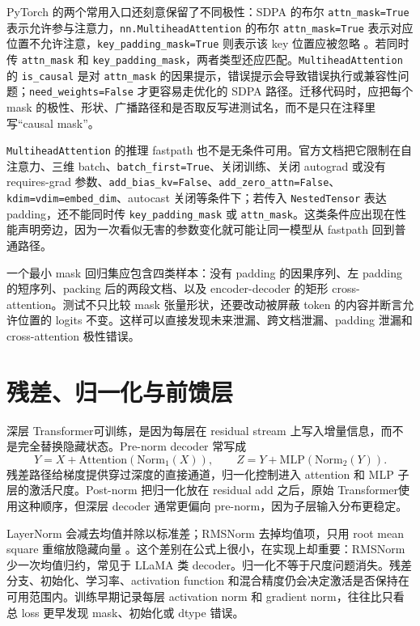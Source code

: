 \documentclass[UTF8,zihao=-4,openany]{ctexbook}
\newcommand{\Transformer}{Transformer}
\begin{document}
PyTorch 的两个常用入口还刻意保留了不同极性：SDPA 的布尔 \texttt{attn\_mask=True} 表示允许参与注意力，\texttt{nn.MultiheadAttention} 的布尔 \texttt{attn\_mask=True} 表示对应位置不允许注意，\texttt{key\_padding\_mask=True} 则表示该 key 位置应被忽略 \cite{pytorch2026multiheadattention}。若同时传 \texttt{attn\_mask} 和 \texttt{key\_padding\_mask}，两者类型还应匹配。\texttt{MultiheadAttention} 的 \texttt{is\_causal} 是对 \texttt{attn\_mask} 的因果提示，错误提示会导致错误执行或兼容性问题；\texttt{need\_weights=False} 才更容易走优化的 SDPA 路径。迁移代码时，应把每个 mask 的极性、形状、广播路径和是否取反写进测试名，而不是只在注释里写“causal mask”。

\texttt{MultiheadAttention} 的推理 fastpath 也不是无条件可用。官方文档把它限制在自注意力、三维 batch、\texttt{batch\_first=True}、关闭训练、关闭 autograd 或没有 requires-grad 参数、\texttt{add\_bias\_kv=False}、\texttt{add\_zero\_attn=False}、\texttt{kdim=vdim=embed\_dim}、autocast 关闭等条件下；若传入 \texttt{NestedTensor} 表达 padding，还不能同时传 \texttt{key\_padding\_mask} 或 \texttt{attn\_mask}。这类条件应出现在性能声明旁边，因为一次看似无害的参数变化就可能让同一模型从 fastpath 回到普通路径。

一个最小 mask 回归集应包含四类样本：没有 padding 的因果序列、左 padding 的短序列、packing 后的两段文档、以及 encoder-decoder 的矩形 cross-attention。测试不只比较 mask 张量形状，还要改动被屏蔽 token 的内容并断言允许位置的 logits 不变。这样可以直接发现未来泄漏、跨文档泄漏、padding 泄漏和 cross-attention 极性错误。

\section{残差、归一化与前馈层}
深层 \Transformer 可训练，是因为每层在 residual stream 上写入增量信息，而不是完全替换隐藏状态。Pre-norm decoder 常写成
\[
Y=X+\mathrm{Attention}(\mathrm{Norm}_1(X)),\qquad
Z=Y+\mathrm{MLP}(\mathrm{Norm}_2(Y)).
\]
残差路径给梯度提供穿过深度的直接通道，归一化控制进入 attention 和 MLP 子层的激活尺度。Post-norm 把归一化放在 residual add 之后，原始 \Transformer 使用这种顺序，但深层 decoder 通常更偏向 pre-norm，因为子层输入分布更稳定。

LayerNorm 会减去均值并除以标准差；RMSNorm 去掉均值项，只用 root mean square 重缩放隐藏向量 \cite{zhang2019root}。这个差别在公式上很小，在实现上却重要：RMSNorm 少一次均值归约，常见于 LLaMA 类 decoder。归一化不等于尺度问题消失。残差分支、初始化、学习率、activation function 和混合精度仍会决定激活是否保持在可用范围内。训练早期记录每层 activation norm 和 gradient norm，往往比只看总 loss 更早发现 mask、初始化或 dtype 错误。
\end{document}
